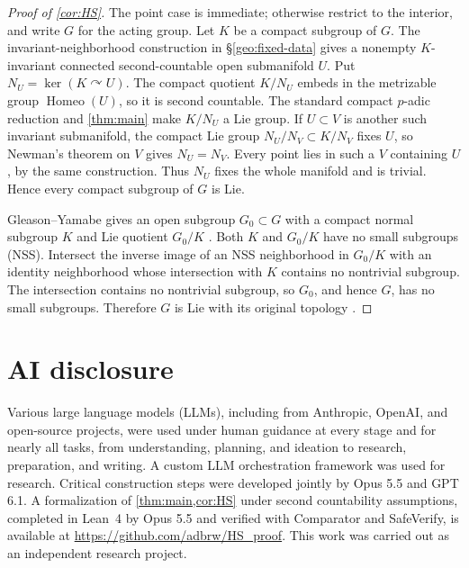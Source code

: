 \documentclass[11pt]{amsart}
\numberwithin{equation}{section}
\theoremstyle{definition}
\theoremstyle{remark}
\begin{document}
\begin{proof}[Proof of \cref{cor:HS}]
The point case is immediate; otherwise restrict to the interior, and
write $G$ for the acting group. Let $K$ be a compact subgroup of $G$. The
invariant-neighborhood construction in \S\ref{geo:fixed-data} gives a
nonempty $K$-invariant connected second-countable open submanifold $U$.
Put $N_U=\ker(K\curvearrowright U)$. The compact quotient $K/N_U$ embeds
in the metrizable group $\operatorname{Homeo}(U)$, so it is second
countable. The standard compact $p$-adic reduction \cite{Pa19} and
\cref{thm:main} make $K/N_U$ a Lie group.
If $U\subset V$ is another such invariant submanifold, the compact Lie
group $N_U/N_V\subset K/N_V$ fixes $U$, so Newman's theorem on $V$
\cite[Theorem (Newman)]{Pa19} gives $N_U=N_V$.
Every point lies in such a $V$ containing $U$, by the same construction.
Thus $N_U$ fixes the whole manifold and is trivial. Hence every compact
subgroup of $G$ is Lie.

Gleason--Yamabe gives an open subgroup $G_0\subset G$ with a compact
normal subgroup $K$ and Lie quotient $G_0/K$ \cite{Gle52,Yam53}.
Both $K$ and $G_0/K$ have no small subgroups (NSS). Intersect the inverse
image of an NSS neighborhood in $G_0/K$ with an identity neighborhood
whose intersection with $K$ contains no nontrivial subgroup. The
intersection contains no nontrivial subgroup, so $G_0$, and hence $G$,
has no small subgroups. Therefore $G$ is Lie with its original topology
\cite{Gle52,Yam53}.
\end{proof}

\section*{AI disclosure}
Various large language models (LLMs), including from Anthropic, OpenAI,
and open-source projects, were used under human guidance at every stage and for nearly
all tasks, from understanding, planning, and ideation to research, preparation, and writing.
A custom LLM orchestration framework was used for research. Critical construction steps
were developed jointly by Opus 5.5 and GPT 6.1. A formalization of \cref{thm:main,cor:HS} under second countability assumptions,
completed in Lean~4 by Opus 5.5 and verified with Comparator and SafeVerify,
is available at \url{https://github.com/adbrw/HS_proof}. This work was carried out as an independent research project.
\end{document}
